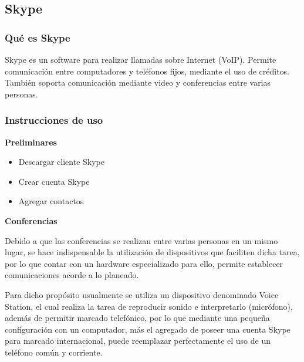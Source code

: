 \newpage

\subsection{Skype}

\subsubsection{Qué es Skype}

Skype es un software para realizar llamadas sobre Internet (VoIP). Permite comunicación entre computadores y teléfonos fijos, mediante el uso de créditos. También soporta comunicación mediante video y conferencias entre varias personas.

\subsubsection{Instrucciones de uso}

\textbf{Preliminares}

\begin{itemize}
    \item Descargar cliente Skype
    \item Crear cuenta Skype
    \item Agregar contactos
\end{itemize}

\textbf{Conferencias}

Debido a que las conferencias se realizan entre varias personas en un mismo lugar, se hace indispensable la utilización de dispositivos que faciliten dicha tarea, por lo que
contar con un hardware especializado para ello, permite establecer comunicaciones acorde a lo planeado.

Para dicho propósito usualmente se utiliza un dispositivo denominado Voice Station, el cual realiza la tarea de reproducir sonido e interpretarlo (micrófono), además de permitir marcado telefónico, por lo que mediante una pequeña configuración con un computador, más el agregado de poseer una cuenta Skype para marcado internacional, puede reemplazar perfectamente el uso de un teléfono común y corriente.

